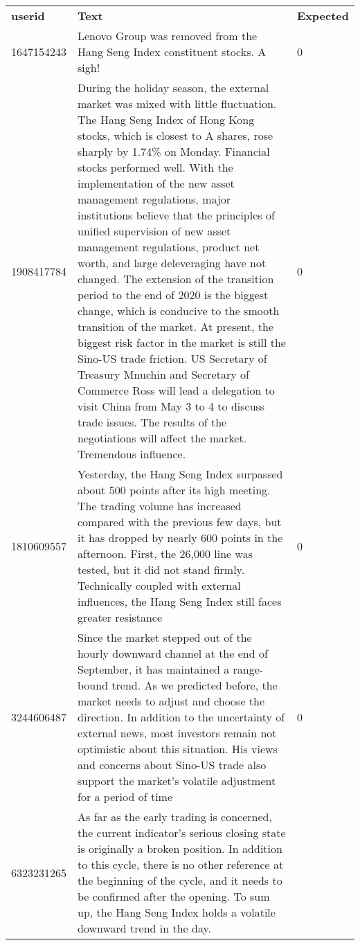 \begin{table}[htbp]
\centering
\begin{tabular}{lll}
\textbf{userid} &
  \textbf{Text} &
  \textbf{Expected} \\
1647154243 &
  Lenovo Group was removed from the Hang Seng Index constituent stocks.  A sigh! &
  0 \\
1908417784 &
  During the holiday season, the external market was mixed with little fluctuation.  The Hang Seng Index of Hong Kong stocks, which is closest to A shares, rose sharply by 1.74\% on Monday. Financial stocks performed well.  With the implementation of the new asset management regulations, major institutions believe that the principles of unified supervision of new asset management regulations, product net worth, and large deleveraging have not changed. The extension of the transition period to the end of 2020 is the biggest change, which is conducive to the smooth transition of the market.  At present, the biggest risk factor in the market is still the Sino-US trade friction. US Secretary of Treasury Mnuchin and Secretary of Commerce Ross will lead a delegation to visit China from May 3 to 4 to discuss trade issues. The results of the negotiations will affect the market.  Tremendous influence. &
  0 \\
1810609557 &
  Yesterday, the Hang Seng Index surpassed about 500 points after its high meeting. The trading volume has increased compared with the previous few days, but it has dropped by nearly 600 points in the afternoon. First, the 26,000 line was tested, but it did not stand firmly.  Technically coupled with external influences, the Hang Seng Index still faces greater resistance &
  0 \\
3244606487 &
  Since the market stepped out of the hourly downward channel at the end of September, it has maintained a range-bound trend. As we predicted before, the market needs to adjust and choose the direction. In addition to the uncertainty of external news, most investors remain not optimistic about this situation.  His views and concerns about Sino-US trade also support the market’s volatile adjustment for a period of time &
  0 \\
6323231265 &
  As far as the early trading is concerned, the current indicator's serious closing state is originally a broken position. In addition to this cycle, there is no other reference at the beginning of the cycle, and it needs to be confirmed after the opening. To sum up, the Hang Seng Index holds a volatile downward trend in the day. &

\end{tabular}
\end{table}
